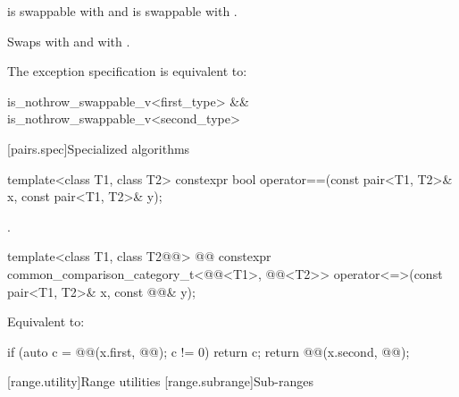 \documentclass{wg21}
\begin{document}
\begin{itemdescr}
    \pnum
    \expects
     is swappable with  and
     is swappable with .

    \pnum
    \effects
    Swaps
     with  and
     with .

    \pnum
    \remarks
    The exception specification is equivalent to:
    \begin{codeblock}
        is_nothrow_swappable_v<first_type> && is_nothrow_swappable_v<second_type>
    \end{codeblock}
\end{itemdescr}

[pairs.spec]{Specialized algorithms}

%
\begin{itemdecl}
    template<class T1, class T2>
    constexpr bool operator==(const pair<T1, T2>& x, const pair<T1, T2>& y);
\end{itemdecl}

\begin{itemdescr}
    \pnum
    \returns
    .
\end{itemdescr}

%
\begin{itemdecl}
    template<class T1, class T2@@>
    @@
    constexpr common_comparison_category_t<@@<T1>,
    @@<T2>>
    operator<=>(const pair<T1, T2>& x, const @@& y);
\end{itemdecl}

\begin{itemdescr}
    \pnum
    \effects
    Equivalent to:
    \begin{codeblock}
        if (auto c = @@(x.first, @@); c != 0) return c;
        return @@(x.second, @@);
    \end{codeblock}
\end{itemdescr}

[range.utility]{Range utilities}
[range.subrange]{Sub-ranges}
\end{document}
